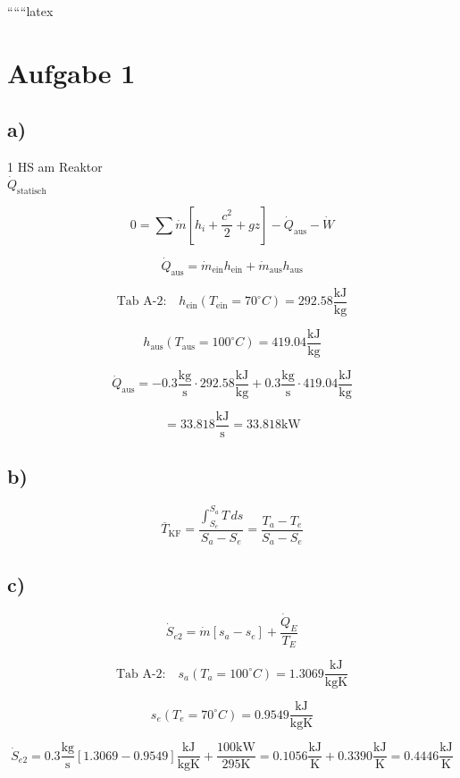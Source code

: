 
``````latex


\section*{Aufgabe 1}

\subsection*{a)}
1 HS am Reaktor \\
\(\dot{Q}_{\text{statisch}}\)

\[
0 = \sum \dot{m} \left[ h_i + \frac{c^2}{2} + g z \right] - \dot{Q}_{\text{aus}} - \dot{W}
\]

\[
\dot{Q}_{\text{aus}} = \dot{m}_{\text{ein}} h_{\text{ein}} + \dot{m}_{\text{aus}} h_{\text{aus}}
\]

\[
\text{Tab A-2:} \quad h_{\text{ein}} (T_{\text{ein}} = 70^\circ C) = 292.58 \frac{\text{kJ}}{\text{kg}}
\]

\[
h_{\text{aus}} (T_{\text{aus}} = 100^\circ C) = 419.04 \frac{\text{kJ}}{\text{kg}}
\]

\[
\dot{Q}_{\text{aus}} = -0.3 \frac{\text{kg}}{\text{s}} \cdot 292.58 \frac{\text{kJ}}{\text{kg}} + 0.3 \frac{\text{kg}}{\text{s}} \cdot 419.04 \frac{\text{kJ}}{\text{kg}}
\]

\[
= 33.818 \frac{\text{kJ}}{\text{s}} = 33.818 \text{kW}
\]

\subsection*{b)}
\[
\overline{T}_{\text{KF}} = \frac{\int_{S_e}^{S_a} T \, ds}{S_a - S_e} = \frac{T_a - T_e}{S_a - S_e}
\]

\subsection*{c)}
\[
\dot{S}_{e2} = \dot{m} \left[ s_a - s_e \right] + \frac{\dot{Q}_E}{T_E}
\]

\[
\text{Tab A-2:} \quad s_a (T_a = 100^\circ C) = 1.3069 \frac{\text{kJ}}{\text{kgK}}
\]

\[
s_e (T_e = 70^\circ C) = 0.9549 \frac{\text{kJ}}{\text{kgK}}
\]

\[
\dot{S}_{e2} = 0.3 \frac{\text{kg}}{\text{s}} \left[ 1.3069 - 0.9549 \right] \frac{\text{kJ}}{\text{kgK}} + \frac{100 \text{kW}}{295 \text{K}} = 0.1056 \frac{\text{kJ}}{\text{K}} + 0.3390 \frac{\text{kJ}}{\text{K}} = 0.4446 \frac{\text{kJ}}{\text{K}}
\]

